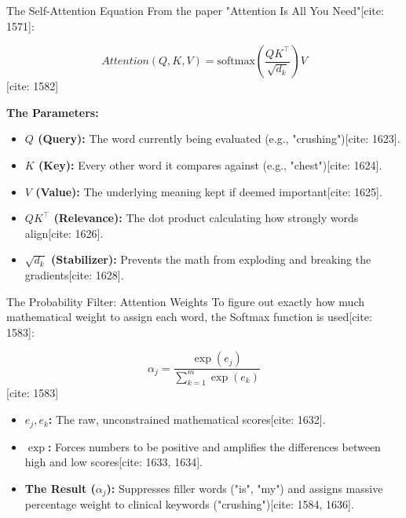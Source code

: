 \documentclass[10pt]{beamer}
\begin{document}
	\begin{frame}{The Self-Attention Equation}
		From the paper "Attention Is All You Need"[cite: 1571]:
		
		$$Attention(Q,K,V) = \text{softmax}\left(\frac{QK^{\top}}{\sqrt{d_k}}\right)V$$ [cite: 1582]
		
		\textbf{The Parameters:}
		\begin{itemize}
			\item \textbf{$Q$ (Query):} The word currently being evaluated (e.g., "crushing")[cite: 1623].
			\item \textbf{$K$ (Key):} Every other word it compares against (e.g., "chest")[cite: 1624].
			\item \textbf{$V$ (Value):} The underlying meaning kept if deemed important[cite: 1625].
			\item \textbf{$QK^{\top}$ (Relevance):} The dot product calculating how strongly words align[cite: 1626].
			\item \textbf{$\sqrt{d_k}$ (Stabilizer):} Prevents the math from exploding and breaking the gradients[cite: 1628].
		\end{itemize}
	\end{frame}
	
	\begin{frame}{The Probability Filter: Attention Weights}
		To figure out exactly how much mathematical weight to assign each word, the Softmax function is used[cite: 1583]:
		
		$$\alpha_{j}=\frac{\exp(e_{j})}{\sum_{k=1}^{m}\exp(e_{k})}$$ [cite: 1583]
		
		\begin{itemize}
			\item \textbf{$e_j, e_k$:} The raw, unconstrained mathematical scores[cite: 1632].
			\item \textbf{$\exp$:} Forces numbers to be positive and amplifies the differences between high and low scores[cite: 1633, 1634].
			\item \textbf{The Result ($\alpha_j$):} Suppresses filler words ("is", "my") and assigns massive percentage weight to clinical keywords ("crushing")[cite: 1584, 1636].
		\end{itemize}
	\end{frame}
	
\end{document}
